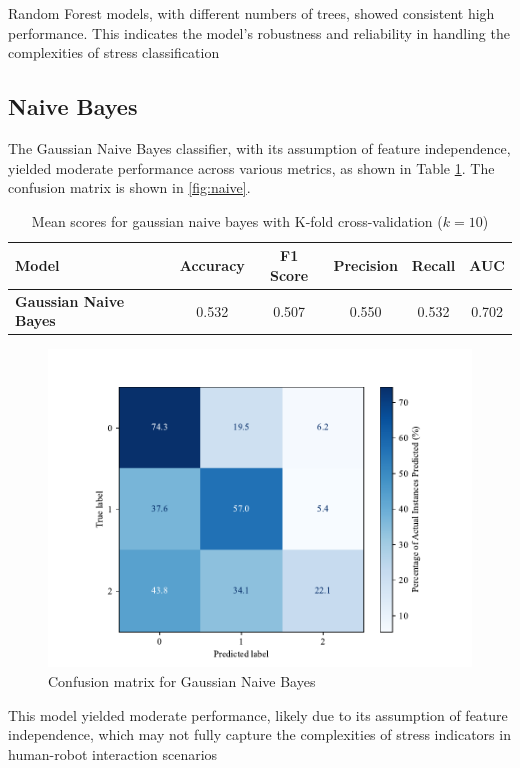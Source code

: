     Random Forest models, with different numbers of trees, showed consistent high performance. This indicates the model's robustness and reliability in handling the complexities of stress classification


\subsection*{Naive Bayes}
The Gaussian Naive Bayes classifier, with its assumption of feature independence, yielded moderate performance across various metrics, as shown in Table \ref{tab:nb_scores}. The confusion matrix is shown in \autoref{fig:naive}.

\begin{table}[hhtbp]
    \centering
    \begin{tabular}{|l|c|c|c|c|c|}
    \hline
    \textbf{Model} & \textbf{Accuracy} & \textbf{F1 Score} & \textbf{Precision} & \textbf{Recall} & \textbf{AUC} \\
    \hline
    \textbf{Gaussian Naive Bayes} & 0.532 & 0.507 & 0.550 & 0.532 & 0.702 \\
    \hline
    \end{tabular}
    \caption{Mean scores for gaussian naive bayes with K-fold cross-validation ($k=10$)}
    \label{tab:nb_scores}
    \end{table}


    \begin{figure}[H]
        \centering
        \includegraphics[width=0.55\columnwidth]{images/confusion_matrix_naive_bayes.pdf}
        \caption{Confusion matrix for Gaussian Naive Bayes}
        \label{fig:naive}
    \end{figure}
    

    This model yielded moderate performance, likely due to its assumption of feature independence, which may not fully capture the complexities of stress indicators in human-robot interaction scenarios



